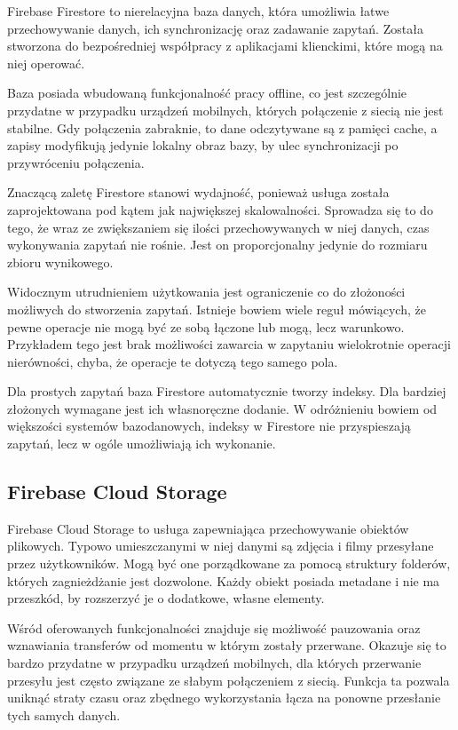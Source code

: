Firebase Firestore to nierelacyjna baza danych, która umożliwia łatwe przechowywanie danych, ich synchronizację oraz zadawanie zapytań. Została stworzona do bezpośredniej współpracy z aplikacjami klienckimi, które mogą na niej operować. 

Baza posiada wbudowaną funkcjonalność pracy offline, co jest szczególnie przydatne w przypadku urządzeń mobilnych, których połączenie z siecią nie jest stabilne. Gdy połączenia zabraknie, to dane odczytywane są z pamięci cache, a zapisy modyfikują jedynie lokalny obraz bazy, by ulec synchronizacji po przywróceniu połączenia.

Znaczącą zaletę Firestore stanowi wydajność, ponieważ usługa została zaprojektowana pod kątem jak największej skalowalności. Sprowadza się to do tego, że wraz ze zwiększaniem się ilości przechowywanych w niej danych, czas wykonywania zapytań nie rośnie. Jest on proporcjonalny jedynie do rozmiaru zbioru wynikowego.

Widocznym utrudnieniem użytkowania jest ograniczenie co do złożoności możliwych do stworzenia zapytań. Istnieje bowiem wiele reguł mówiących, że pewne operacje nie mogą być ze sobą łączone lub mogą, lecz warunkowo. Przykładem tego jest brak możliwości zawarcia w zapytaniu wielokrotnie operacji nierówności, chyba, że operacje te dotyczą tego samego pola.

Dla prostych zapytań baza Firestore automatycznie tworzy indeksy. Dla bardziej złożonych wymagane jest ich własnoręczne dodanie. W odróżnieniu bowiem od większości systemów bazodanowych, indeksy w Firestore nie przyspieszają zapytań, lecz w ogóle umożliwiają ich wykonanie.

\subsection{Firebase Cloud Storage}
\label{technologie-storage}

Firebase Cloud Storage to usługa zapewniająca przechowywanie obiektów plikowych. Typowo umieszczanymi w niej danymi są zdjęcia i filmy przesyłane przez użytkowników. Mogą być one porządkowane za pomocą struktury folderów, których zagnieżdżanie jest dozwolone. Każdy obiekt posiada metadane i nie ma przeszkód, by rozszerzyć je o dodatkowe, własne elementy.

Wśród oferowanych funkcjonalności znajduje się możliwość pauzowania oraz wznawiania transferów od momentu w którym zostały przerwane. Okazuje się to bardzo przydatne w przypadku urządzeń mobilnych, dla których przerwanie przesyłu jest często związane ze słabym połączeniem z siecią. Funkcja ta pozwala uniknąć straty czasu oraz zbędnego wykorzystania łącza na ponowne przesłanie tych samych danych. 

